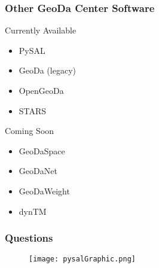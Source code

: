 \begin{frame}
	\frametitle{Other GeoDa Center Software}
 
\begin{block}{Currently Available}
 \begin{itemize}
 \item PySAL
 \item GeoDa (legacy)
 \item OpenGeoDa
 \item STARS
 \end{itemize}
 \end{block} 
\begin{block}{Coming Soon}
 \begin{itemize}
 \item GeoDaSpace
 \item GeoDaNet
 \item GeoDaWeight
 \item dynTM
 \end{itemize}
 \end{block} \end{frame} 

\begin{frame}
	\frametitle{Questions}
  \begin{center}
 \begin{figure}[htbp]
 \texttt{[image: pysalGraphic.png]}
 \end{figure}
  {}\\
  {}
 \end{center}
 \end{frame} 




